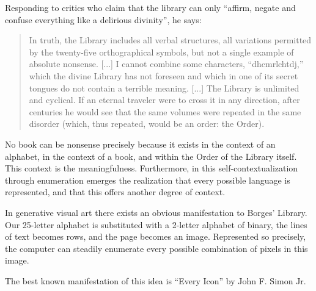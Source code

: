 \documentclass{thesis}
\begin{document}
	Responding to critics who claim that the library can only ``affirm, negate and confuse everything like a delirious divinity'', he says:
	
	\begin{quote}
	In truth, the Library includes all verbal structures, all variations permitted by the twenty-five orthographical symbols, but not a single example of absolute nonsense. [...] I cannot combine some characters, ``dhcmrlchtdj,'' which the divine Library has not foreseen and which in one of its secret tongues do not contain a terrible meaning. [...] The Library is unlimited and cyclical. If an eternal traveler were to cross it in any direction, after centuries he would see that the same volumes were repeated in the same disorder (which, thus repeated, would be an order: the Order).
	\end{quote}
	
	No book can be nonsense precisely because it exists in the context of an alphabet, in the context of a book, and within the Order of the Library itself. This context is the meaningfulness. Furthermore, in this self-contextualization through enumeration emerges the realization that every possible language is represented, and that this offers another degree of context.
	
	In generative visual art there exists an obvious manifestation to Borges' Library. Our 25-letter alphabet is substituted with a 2-letter alphabet of binary, the lines of text becomes rows, and the page becomes an image. Represented so precisely, the computer can steadily enumerate every possible combination of pixels in this image.
	
	The best known manifestation of this idea is ``Every Icon'' by John F. Simon Jr.\cite{john_f._simon_jr._every_????}\cite{john_f._simon_jr._given:32_1997}\cite{matthew_mirapaul_in_1997}	
	
	\cite{jim_campbell_end_1996}
	\cite{leander_seige_imagen_????}
	\cite{leonardo_solaas_magic_????}
	\cite{sintron_gods_2003}
	
	\cite{michael_aschauer_8-bit_????}
	\cite{nattiez_music_1990}
	\cite{remko_scha_every_2001}
	\cite{tomczak_all_2009}
	\cite{tomczak_hardware-based_2009}
	\cite{alexander_christiaan_jacob_allrgb_2008}
	\cite{allan_mccollum_shapes_2006}
	\cite{jem_finer_longplayer_????}
	\cite{john_cage_as_????}
	\cite{paul_slocum_pi_2007}
	\cite{brian_whitman_eigenradio_2005}
	\cite{keith_f._lynch_converting_????}
	\cite{tom_johnson_liner_1999}
	\cite{christian_scheib_statics_????}
	
\end{document}

